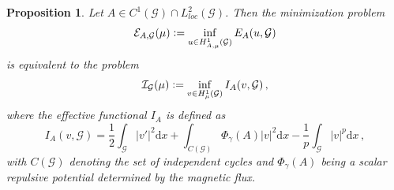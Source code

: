 \documentclass[12pt,a4paper]{amsart}
\theoremstyle{definition}
\theoremstyle{plain}
\newtheorem{proposition}[definition]{Proposition}
\newcommand{\defeq}{\vcentcolon=}
\numberwithin{equation}{section}
\begin{document}
\begin{proposition} \label{equivalence}
Let $A \in C^1(\mathcal{G}) \cap L^2_{loc}(\mathcal{G})$. Then the minimization problem
    \begin{equation}
         \mathcal{E}_{A,\mathcal{G}}(\mu) \defeq \inf_{u \in H^1_{A,\mu}(\mathcal{G})} E_A(u, \mathcal{G})
    \end{equation}
    is equivalent to the problem
    \begin{equation}
        \mathcal{I}_\mathcal{G}(\mu) \defeq \inf_{v \in H^1_{\mu}(\mathcal{G})} I_A(v, \mathcal{G})\,,
        \label{Ig2}
    \end{equation}
    where the effective functional $I_A$ is defined as
    \begin{equation} \label{Ia}
        I_A(v,\mathcal{G})  = \frac{1}{2}\int_{\mathcal{G}} |v'|^2 \mathrm{d}x + \int_{C(\mathcal{G})} \Phi_{\gamma}(A) |v|^2 \mathrm{d}x - \frac{1}{p} \int_{\mathcal{G}} |v|^p \mathrm{d}x\,,
    \end{equation}
    with $C(\mathcal{G})$ denoting the set of independent cycles and $\Phi_{\gamma}(A)$ being a scalar repulsive potential determined by the magnetic flux.
\end{proposition}
\end{document}
